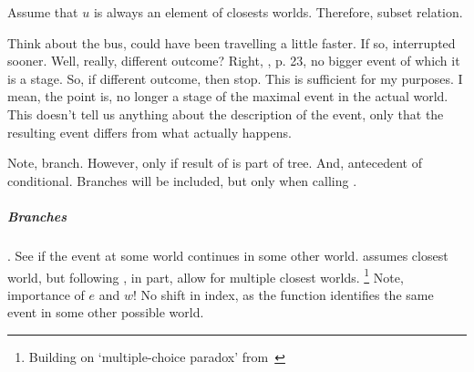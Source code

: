 \begin{note}
  Assume that \(u\) is always an element of closests worlds.
  Therefore, subset relation.
\end{note}

\begin{note}
  Think about the bus, could have been travelling a little faster.
  If so, interrupted sooner.
  Well, really, different outcome?
  Right, \citeauthor{Landman:1992wh}, p. 23, no bigger event of which it is a stage.
  So, if different outcome, then stop.
  This is sufficient for my purposes.
  I mean, the point is, no longer a stage of the maximal event in the actual world.
  This doesn't tell us anything about the description of the event, only that the resulting event differs from what actually happens.
\end{note}

\begin{note}
  Note, branch.
  However, only if result of \AlgGetPStops{} is part of tree.
  And, antecedent of conditional.
  Branches will be included, but only when calling \AlgFindBranches{}.
\end{note}

\subparagraph{Branches}

\begin{note}
  \AlgFindBranches{}.
  See if the event at some world continues in some other world.
  \citeauthor{Landman:1992wh} assumes closest world, but following \textcite[37]{Szabo:2004ul}, in part, allow for multiple closest worlds.%
  \footnote{
    Building on `multiple-choice paradox' from~\textcite{Bonomi:1997uq}
  }
  Note, importance of \(e\) and \(w\)!
  No shift in index, as the function identifies the same event in some other possible world.

    \begin{algorithm}[H]
    \SetAlgoLined
    \DontPrintSemicolon
    \caption{\AlgFindBranches{}\label{PrAl:find-branches}}
  \end{algorithm}
\end{note}

